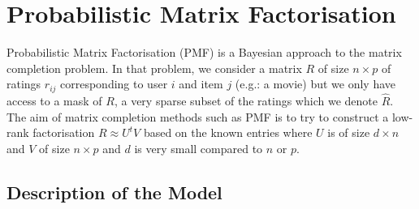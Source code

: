 %



\section{Probabilistic Matrix Factorisation}

Probabilistic Matrix Factorisation (PMF) \citep{mnih08} is a Bayesian approach to the matrix completion problem. In that problem, we consider a matrix $R$ of size $n\times p$ of ratings $r_{ij}$ corresponding to user $i$ and item $j$ (e.g.: a movie) but we only have access to a mask of $R$, a very sparse subset of the ratings which we denote $\hat R$. The aim of matrix completion methods such as PMF is to try to construct a low-rank factorisation  $R\approx U^{t}V$ based on the known entries where $U$ is of size $d\times n$ and $V$ of size $n\times p$ and $d$ is very small compared to $n$ or $p$. 

\subsection{Description of the  Model}

